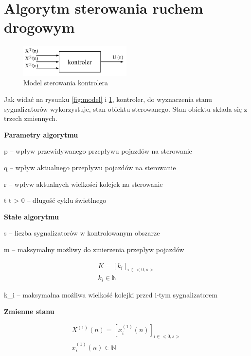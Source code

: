 \section{Algorytm sterowania ruchem drogowym}
\begin{figure}[h]
    \centering
    \includegraphics[width=0.5\textwidth]{images/kontroler.pdf}
    \caption{Model sterowania kontrolera}
    \label{fig:kontroler}
\end{figure}

Jak widać na rysunku \ref{fig:model} i \ref{fig:kontroler}, kontroler, do wyznaczenia stanu sygnalizatorów wykorzystuje, stan obiektu sterowanego. Stan obiektu składa się z trzech zmiennych.

\vspace{1.5cm}
\textbf{Parametry algorytmu}

p  \textrm{ -- wpływ przewidywanego przepływu pojazdów na sterowanie}

q  \textrm{ -- wpływ aktualnego przepływu pojazdów na sterowanie}

r  \textrm{ -- wpływ aktualnych wielkości kolejek na sterowanie}

t \in {} \textrm{ } t > 0 \textrm{ -- długość cyklu świetlnego}

\vspace{1.5cm}
\textbf{Stałe algorytmu}

s \in {} \textrm{ -- liczba sygnalizatorów w kontrolowanym obszarze}

m \in {} \textrm{ -- maksymalny możliwy do zmierzenia przepływ pojazdów}

\begin{equation}
	\begin{array}{c}
		K = \left[ k_{i} \right]_{i \in <0,s>}\\
		k_{i} \in \mathbb{N}
	\end{array}
\end{equation}

k_{i} \textrm{ -- maksymalna możliwa wielkość kolejki przed i-tym sygnalizatorem}

\vspace{1.5cm}
\textbf{Zmienne stanu}

\begin{equation}
	\begin{array}{c}
		X^{(1)} (n) = \left[ x^{(1)}_{i} (n) \right]_{i \in <0,s>}\\
		x^{(1)}_{i} (n) \in \mathbb{N}
	\end{array}
\end{equation}

